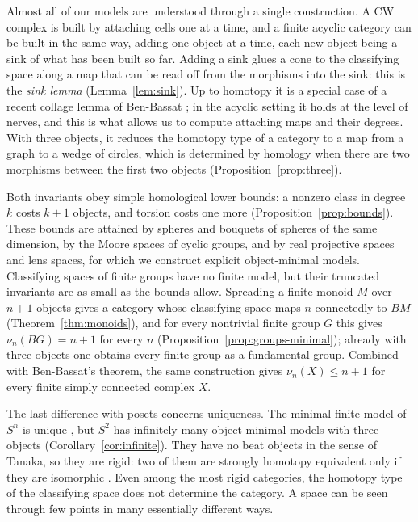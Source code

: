 \documentclass[12pt]{amsart}
\theoremstyle{definition}
\theoremstyle{remark}
\begin{document}
Almost all of our models are understood through a single construction. A CW complex is built by attaching cells one at a time, and a finite acyclic category can be built in the same way, adding one object at a time, each new object being a sink of what has been built so far. Adding a sink glues a cone to the classifying space along a map that can be read off from the morphisms into the sink: this is the \emph{sink lemma} (Lemma~\ref{lem:sink}). Up to homotopy it is a special case of a recent collage lemma of Ben-Bassat \cite[Lemma~2.5]{BenBassat2026}; in the acyclic setting it holds at the level of nerves, and this is what allows us to compute attaching maps and their degrees. With three objects, it reduces the homotopy type of a category to a map from a graph to a wedge of circles, which is determined by homology when there are two morphisms between the first two objects (Proposition~\ref{prop:three}).

Both invariants obey simple homological lower bounds: a nonzero class in degree $k$ costs $k+1$ objects, and torsion costs one more (Proposition~\ref{prop:bounds}). These bounds are attained by spheres and bouquets of spheres of the same dimension, by the Moore spaces of cyclic groups, and by real projective spaces and lens spaces, for which we construct explicit object-minimal models. Classifying spaces of finite groups have no finite model, but their truncated invariants are as small as the bounds allow. Spreading a finite monoid $M$ over $n+1$ objects gives a category whose classifying space maps $n$-connectedly to $BM$ (Theorem~\ref{thm:monoids}), and for every nontrivial finite group $G$ this gives $\nu_n(BG)=n+1$ for every $n$ (Proposition~\ref{prop:groups-minimal}); already with three objects one obtains every finite group as a fundamental group. Combined with Ben-Bassat's theorem, the same construction gives $\nu_n(X)\le n+1$ for every finite simply connected complex $X$.

The last difference with posets concerns uniqueness. The minimal finite model of $S^n$ is unique \cite[Corollary~2.14]{BarmakMinian2007}, but $S^2$ has infinitely many object-minimal models with three objects (Corollary~\ref{cor:infinite}). They have no beat objects in the sense of Tanaka, so they are rigid: two of them are strongly homotopy equivalent only if they are isomorphic \cite{Tanaka2019}. Even among the most rigid categories, the homotopy type of the classifying space does not determine the category. A space can be seen through few points in many essentially different ways.
\end{document}
